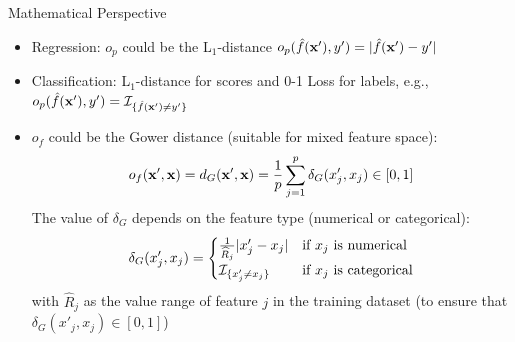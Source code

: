 \documentclass[11pt,compress,t,notes=noshow, aspectratio=169, xcolor=table, usenames,dvipsnames]{beamer}
\begin{document}
\begin{frame}{Mathematical Perspective }
	
	\begin{itemize}
		\item Regression: $o_p$ could be the L$_1$-distance $o_p(\fh(\xv'), y') = |\fh(\xv')-y'|$
		\item Classification:
		L$_1$-distance for scores and 0-1 Loss for labels, e.g., $o_p(\fh(\xv'), y') = \Ind_{\{ \fh(\xv') \neq y' \}}$
		\pause
		\item $o_f$ could be the Gower distance (suitable for mixed feature space):
		$$o_f(\xv', \xv) = \Gower(\xv', \xv) = \frac{1}{p}\sum_{j = 1}^{p} \delta_G(x'_j, x_j)	\in [0, 1]$$
		The value of $\delta_G$ depends on the feature type (numerical or categorical):
		\begin{equation*}
		\delta_G(x'_j, x_j) =
		\begin{cases}
		\frac{1}{\widehat{R}_j}|x_j'- x_j| & \text{if $x_j$ is numerical} \\
		\Ind_{\{ x_j' \neq x_j \}} & \text{if $x_j$ is categorical}
		\end{cases}
		\end{equation*}
		with $\widehat{R}_j$ as the value range of feature $j$ in the training dataset (to ensure that $\delta_G(x'_j, x_j)	\in [0, 1]$)
	\end{itemize}
\end{frame}
\end{document}
